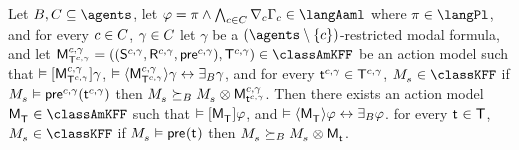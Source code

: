 \begin{lemma}\label{aaml-kff-covers}
Let $\agentsB, \agentsC \subseteq \agents$, 
let $\phi = \pi \land \bigwedge_{\agentC \in \agentsC} \coverC \Gamma_\agentC \in \langAaml$ where $\pi \in \langPl$, and 
for every $\agentC \in \agentsC$, $\gamma \in \agentsC$
let $\gamma$ be a $(\agents \setminus \{\agentC\})$-restricted modal formula, and
let $\aPModelAndTuple[\agentC, \gamma]{\aStatesT[\agentC, \gamma]} \in \classAmKFF$ be an action model such that 
$\entails \actionA{\aPModel[\agentC, \gamma]{\aStatesT[\agentC, \gamma]}} \gamma$,
$\entails \actionE{\aPModel[\agentC, \gamma]{\aStatesT[\agentC, \gamma]}} \gamma \iff \someactsBs \gamma$, and
for every $\aStateT[\agentC, \gamma] \in \aStatesT[\agentC, \gamma]$, $\kPModel{\kStateS} \in \classKFF$ if $\kPModel{\kStateS} \entails \aPrecondition[\agentC, \gamma](\aStateT[\agentC, \gamma])$ then $\kPModel{\kStateS} \simulatesBs \kPModel{\kStateS} \exec \aPModel[\agentC, \gamma]{\aStateT[\agentC, \gamma]}$.
Then there exists an action model $\aPModel{\aStatesT} \in \classAmKFF$ such that 
$\entails \actionA{\aPModel{\aStatesT}} \phi$, and 
$\entails \actionE{\aPModel{\aStatesT}} \phi \iff \someactsBs \phi$.
for every $\aStateT \in \aStatesT$, $\kPModel{\kStateS} \in \classKFF$ if $\kPModel{\kStateS} \entails \aPrecondition(\aStateT)$ then $\kPModel{\kStateS} \simulatesBs \kPModel{\kStateS} \exec \aPModel{\aStateT}$.
\end{lemma}

